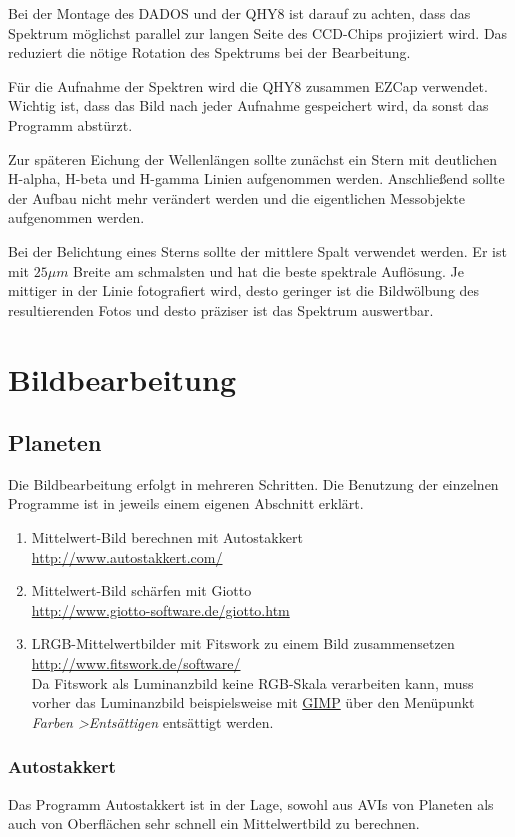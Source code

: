 \documentclass[10pt,a4paper,titlepage]{article}
\begin{document}
Bei der Montage des DADOS und der QHY8 ist darauf zu achten, dass das Spektrum möglichst parallel zur langen Seite des CCD-Chips projiziert wird. Das reduziert die nötige Rotation des Spektrums bei der Bearbeitung.

Für die Aufnahme der Spektren wird die QHY8 zusammen EZCap verwendet. Wichtig ist, dass das Bild nach jeder Aufnahme gespeichert wird, da sonst das Programm abstürzt.

Zur späteren Eichung der Wellenlängen sollte zunächst ein Stern mit deutlichen H-alpha, H-beta und H-gamma Linien aufgenommen werden. Anschließend sollte der Aufbau nicht mehr verändert werden und die eigentlichen Messobjekte aufgenommen werden.

Bei der Belichtung eines Sterns sollte der mittlere Spalt verwendet werden. Er ist mit $25\mu m$ Breite am schmalsten und hat die beste spektrale Auflösung. Je mittiger in der Linie fotografiert wird, desto geringer ist die Bildwölbung des resultierenden Fotos und desto präziser ist das Spektrum auswertbar.

\section{Bildbearbeitung}
\subsection{Planeten}
Die Bildbearbeitung erfolgt in mehreren Schritten. Die Benutzung der einzelnen Programme ist in jeweils einem eigenen Abschnitt erklärt.
\begin{enumerate}
\item Mittelwert-Bild berechnen mit Autostakkert \\ \url{http://www.autostakkert.com/}
\item Mittelwert-Bild schärfen mit Giotto \\ \url{http://www.giotto-software.de/giotto.htm}
\item LRGB-Mittelwertbilder mit Fitswork zu einem Bild zusammensetzen \\ \url{http://www.fitswork.de/software/} \\
Da Fitswork als Luminanzbild keine RGB-Skala verarbeiten kann, muss vorher das Luminanzbild beispielsweise mit \href{http://gimp.org}{GIMP} über den Menüpunkt \textit{Farben \textgreater Entsättigen} entsättigt werden.
\end{enumerate}
\subsubsection{Autostakkert}
Das Programm Autostakkert ist in der Lage, sowohl aus AVIs von Planeten als auch von Oberflächen sehr schnell ein Mittelwertbild zu berechnen.
\end{document}
